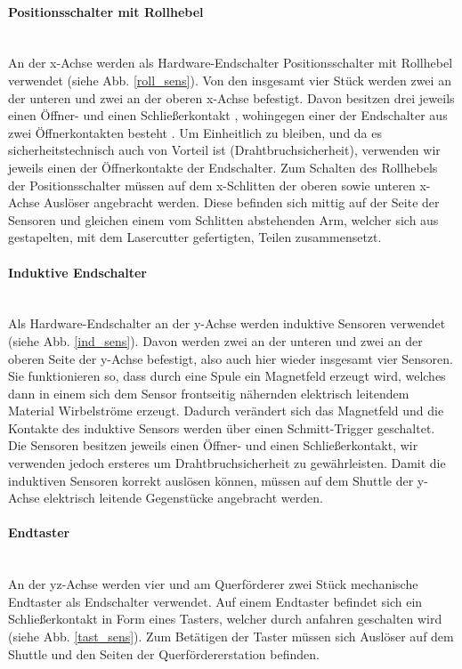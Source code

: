 \paragraph{Positionsschalter mit Rollhebel} \mbox{}\\
An der x-Achse werden als Hardware-Endschalter Positionsschalter mit Rollhebel verwendet (siehe Abb. \ref{roll_sens}). Von den insgesamt vier Stück werden zwei an der unteren und zwei an der oberen x-Achse befestigt. Davon besitzen drei jeweils einen Öffner- und einen Schließerkontakt \cite{schmersal_3}, wohingegen einer der Endschalter aus zwei Öffnerkontakten besteht \cite{schmersal_1}. Um Einheitlich zu bleiben, und da es sicherheitstechnisch auch von Vorteil ist (Drahtbruchsicherheit), verwenden wir jeweils einen der Öffnerkontakte der Endschalter. Zum Schalten des Rollhebels der Positionsschalter müssen auf dem x-Schlitten der oberen sowie unteren x-Achse Auslöser angebracht werden. Diese befinden sich mittig auf der Seite der Sensoren und gleichen einem vom Schlitten abstehenden Arm, welcher sich aus gestapelten, mit dem Lasercutter gefertigten, Teilen zusammensetzt.

\paragraph{Induktive Endschalter} \mbox{}\\
Als Hardware-Endschalter an der y-Achse werden induktive Sensoren verwendet (siehe Abb. \ref{ind_sens}). Davon werden zwei an der unteren und zwei an der oberen Seite der y-Achse befestigt, also auch hier wieder insgesamt vier Sensoren. Sie funktionieren so, dass durch eine Spule ein Magnetfeld erzeugt wird, welches dann in einem sich dem Sensor frontseitig nähernden elektrisch leitendem Material Wirbelströme erzeugt. Dadurch verändert sich das Magnetfeld und die Kontakte des induktive Sensors werden über einen Schmitt-Trigger geschaltet. Die Sensoren besitzen jeweils einen Öffner- und einen Schließerkontakt, wir verwenden jedoch ersteres um Drahtbruchsicherheit zu gewährleisten. Damit die induktiven Sensoren korrekt auslösen können, müssen auf dem Shuttle der y-Achse elektrisch leitende Gegenstücke angebracht werden.

\paragraph{Endtaster} \mbox{}\\
An der yz-Achse werden vier und am Querförderer zwei Stück mechanische Endtaster als Endschalter verwendet. Auf einem Endtaster befindet sich ein Schließerkontakt in Form eines Tasters, welcher durch anfahren geschalten wird (siehe Abb. \ref{tast_sens}). Zum Betätigen der Taster müssen sich Auslöser auf dem Shuttle und den Seiten der Querfördererstation befinden.\\

